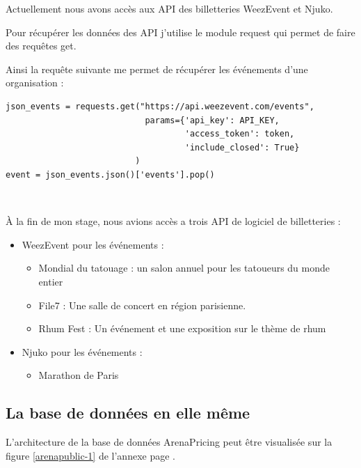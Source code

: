 Actuellement nous avons accès aux API des billetteries WeezEvent et Njuko. 

Pour récupérer les données des API j'utilise le module request qui permet de faire des requêtes get.

Ainsi la requête suivante me permet de récupérer les événements d'une organisation :

\lstset{style=custompython}
\begin{lstlisting}
json_events = requests.get("https://api.weezevent.com/events",
                            params={'api_key': API_KEY,
                                    'access_token': token,
                                    'include_closed': True}
                          )
event = json_events.json()['events'].pop()
\end{lstlisting}
\leavevmode \

À la fin de mon stage, nous avions accès a trois API de logiciel de billetteries : 
\begin{itemize}
  \item[\textbullet] WeezEvent pour les événements :
  \begin{itemize}
	\item Mondial du tatouage : un salon annuel pour les tatoueurs du monde entier
	\item File7 : Une salle de concert en région parisienne. 
	\item Rhum Fest : Un événement et une exposition sur le thème de rhum
  \end{itemize}
  \item[\textbullet] Njuko pour les événements :
  \begin{itemize}
  	\item Marathon de Paris
  \end{itemize}

\end{itemize}

\subsection{La base de données en elle même}
L'architecture de la base de données ArenaPricing peut être visualisée sur la figure \ref{arenapublic-1} de l'annexe page \pageref{arenapublic-1}.



		